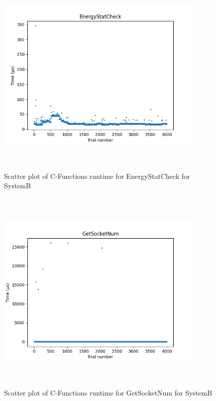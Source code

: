\begin{figure}[H]
	\centering
	\includegraphics[width=10cm,height=10cm,keepaspectratio]{RuntimeResults_SystemB/CFunctions/EnergyStatCheck_scatter.png}
	\caption{Scatter plot of C-Functions runtime for EnergyStatCheck for SystemB}
	\label{fig:C-Functions|EnergyStatCheck|SystemB}
\end{figure}

\begin{figure}[H]
	\centering
	\includegraphics[width=10cm,height=10cm,keepaspectratio]{RuntimeResults_SystemB/CFunctions/GetSocketNum_scatter.png}
	\caption{Scatter plot of C-Functions runtime for GetSocketNum for SystemB}
	\label{fig:C-Functions|GetSocketNum|SystemB}
\end{figure}

